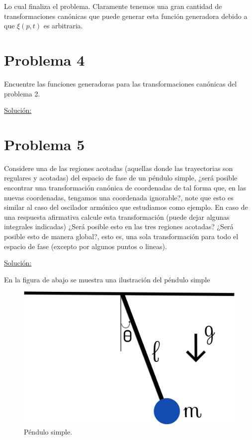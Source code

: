 \documentclass[a4paper,10pt]{article}
\numberwithin{equation}{section}
\begin{document}
Lo cual finaliza el problema. Claramente tenemos una gran cantidad de transformaciones 
canónicas que puede generar esta función generadora debido a que $\xi(p,t)$ es arbitraria.

\section{Problema 4}

Encuentre las funciones generadoras para las transformaciones canónicas del problema 
2.

\vspace{.3cm}

\underline{Solución:} \vspace{.3cm}

\section{Problema 5}

Considere una de las regiones acotadas (aquellas donde las trayectorias son regulares 
y acotadas) del espacio de fase de un péndulo simple, ¿será posible encontrar una 
transformación canónica de coordenadas de tal forma que, en las nuevas coordenadas, 
tengamos una coordenada ignorable?, note que esto es similar al caso del oscilador 
armónico que estudiamos como ejemplo. En caso de una respuesta afirmativa calcule 
esta transformación (puede dejar algunas integrales indicadas) ¿Será posible 
esto en las tres regiones acotadas? ¿Será posible esto de manera global?, esto es,
una sola transformación para todo el espacio de fase (excepto por algunos puntos o 
lineas).

\vspace{.3cm}

\underline{Solución:} \vspace{.3cm}

En la figura de abajo se muestra una ilustración del péndulo simple

\begin{figure}[H]
 \center 
 \includegraphics[scale=0.4]{problema5fig1}
 \caption{Péndulo simple.}
 \label{fig:problema5fig1}
\end{figure}
\end{document}
